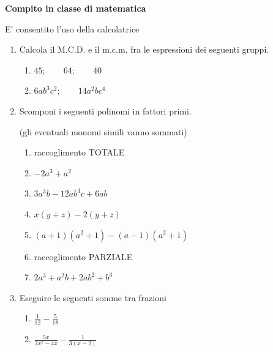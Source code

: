 \documentclass[14pt]{extarticle}
\begin{document}
\newpage


\begin{center}
{\bf Compito in classe di matematica}

{\tiny E' consentito l'uso della calcolatrice}
\end{center}


\begin{enumerate}[label=\bfseries\arabic*)]
	\item Calcola il M.C.D. e il m.c.m. fra le espressioni dei seguenti gruppi.
		\begin{enumerate}
			\item
				$
					45;\qquad 64;\qquad 40
				$
			\item
				$
					6ab^3c^2;\qquad 14a^2bc^4			
				$				
		\end{enumerate}
	
	\item Scomponi i seguenti polinomi in fattori primi. 

	\vspace{-10pt}

	{\tiny (gli eventuali monomi simili vanno sommati)}
	
		\begin{enumerate}
			
			\item[] raccoglimento TOTALE 
			\item
				$
					-2a^3 + a^2
				$
			\item
				$
					3a^3b - 12ab^3c + 6ab 
				$
			\item
				$
					x\left( y + z \right) - 2\left( y + z \right)
				$			
			\item
				$
					\left( a + 1 \right)\left( a^2 + 1 \right) - \left( a - 1 \right)\left( a^2 + 1 \right)
				$


			\item[] raccoglimento PARZIALE 
			
			\item 
					$
						2a^3 + a^2b + 2ab^2 + b^3
					$


		\end{enumerate}
	
		\item Eseguire le seguenti somme tra frazioni
			\begin{enumerate}
				\item
					$
						\frac{1}{12} - \frac{5}{18}
					$				
				\item
					$
						\frac{5x}{2x^2 - 4x} - \frac{1}{3(x - 2)}
					$
			\end{enumerate}
		

\end{enumerate}
\end{document}

